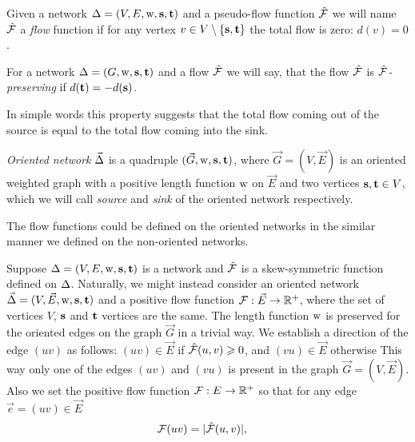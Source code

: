\documentclass[12pt]{amsart}
\begin{document}
    \begin{definition}
      Given a network $\Delta = (V, E, \mathrm{w}, \mathbf{s}, \mathbf{t})$ and a pseudo-flow function $\mathcal{\hat{F}}$ we will name $\mathcal{\hat{F}}$ a
        \emph{flow} function if for any vertex $v \in V \setminus \{\mathbf{s}, \mathbf{t}\}$ the total flow is zero: $d(v) = 0$.
    \end{definition}
    \begin{definition}
      For a network $\Delta = (G, \mathrm{w}, \mathbf{s}, \mathbf{t})$ and a flow $\mathcal{\hat{F}}$ we will say,
      that the flow $\mathcal{\hat{F}}$ is \emph{$\mathcal{\hat{F}}$-preserving} if $d(\mathbf{t}) = -d(\mathbf{s})$.
    \end{definition}
    \begin{note}
      In simple words this property suggests
        that the total flow coming out of the source is equal to the total flow
        coming into the sink.
    \end{note}
    \begin{definition}
      \emph{Oriented network} $\vec{\Delta}$ is a quadruple $(\vec{G}, \mathrm{w}, \mathbf{s}, \mathbf{t})$, where
        $\vec{G} = (V, \vec{E})$ is an oriented weighted graph with
        a positive length function $\mathrm{w}$ on $\vec{E}$ and two vertices $\mathbf{s}, \mathbf{t} \in V$, which
        we will call \emph{source} and \emph{sink} of the oriented network respectively.
    \end{definition}
    \begin{note}
      The flow functions could be defined on the oriented networks in the similar manner
      we defined on the non-oriented networks.
    \end{note}
    Suppose $\Delta = (V, E, \mathrm{w}, \mathbf{s}, \mathbf{t})$ is a network and $\mathcal{\hat{F}}$ is a skew-symmetric function defined
    on $\Delta$.
    Naturally, we might instead consider an oriented network $\vec{\Delta} = (V, \vec{E}, \mathrm{w}, \mathbf{s}, \mathbf{t})$ and a
      positive flow function $\mathcal{F}: \vec{E} \to \mathbb{R}^{+}$, where
      the set of vertices $V$, $\mathbf{s}$ and $\mathbf{t}$ vertices are the same.
    The length function $\mathrm{w}$ is preserved for the oriented edges on the graph $\vec{G}$ in a trivial way.
    We establish a direction of the edge $(uv)$ as follows:
      $(uv) \in \vec{E}$ if $\mathcal{\hat{F}}(u, v) \geqslant 0$, and $(vu) \in \vec{E}$ otherwise
    This way only one of the edges $(uv)$ and $(vu)$ is present in the graph $\vec{G} = (V, \vec{E})$.
    Also we set the positive flow function $\mathcal{F}: E \to \mathbb{R}^{+}$ so that
      for any edge $\vec{e} = (uv) \in \vec{E}$
    \begin{align*}
      &\mathcal{F}(u v) = |\mathcal{\hat{F}}(u,v)|,
    \end{align*}
\end{document}
